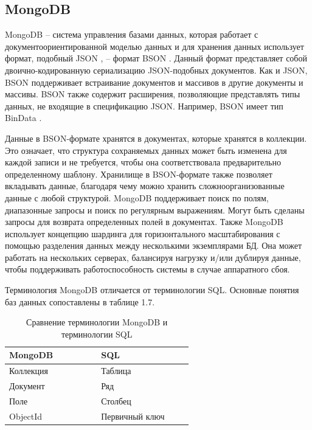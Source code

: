 \subsection{MongoDB}

MongoDB  \cite{Mongo} -- система управления базами данных, которая работает с документоориентированной моделью данных и для хранения данных использует формат, подобный JSON \cite{JSON}, -- формат BSON \cite{BSON}. Данный формат представляет собой двоично-кодированную сериализацию JSON-подобных документов. Как и JSON, BSON поддерживает встраивание документов и массивов в другие документы и массивы. BSON также содержит расширения, позволяющие представлять типы данных, не входящие в спецификацию JSON. Например, BSON имеет тип BinData \cite{BinData}.

Данные в BSON-формате хранятся в документах, которые хранятся в коллекции. Это означает, что структура сохраняемых данных может быть изменена для каждой записи и не требуется, чтобы она соответствовала предварительно определенному шаблону. Хранилище в BSON-формате также позволяет вкладывать данные, благодаря чему можно хранить сложноорганизованные данные с любой структурой. MongoDB поддерживает поиск по полям, диапазонные запросы и поиск по регулярным выражениям. Могут быть сделаны запросы для возврата определенных полей в документах. Также MongoDB использует концепцию шардинга для горизонтального масштабирования с помощью разделения данных между несколькими экземплярами БД. Она может работать на нескольких серверах, балансируя нагрузку и/или дублируя данные, чтобы поддерживать работоспособность системы в случае аппаратного сбоя. 

Терминология MongoDB отличается от терминологии SQL. Основные понятия баз данных сопоставлены в таблице 1.7.

\begin{table}[H]
\caption{Сравнение терминологии MongoDB и терминологии SQL}
\begin{center}
\begin{tabular}{|p{0.3\linewidth}|p{0.3\linewidth}|}
		\hline
		MongoDB & SQL \\ [0.5ex] 
 		\hline
		Коллекция & Таблица \\
		\hline
		Документ & Ряд \\
		\hline
		Поле & Столбец \\
		\hline
		ObjectId & Первичный ключ \\
		\hline
\end{tabular}
\end{center}
\end{table}

